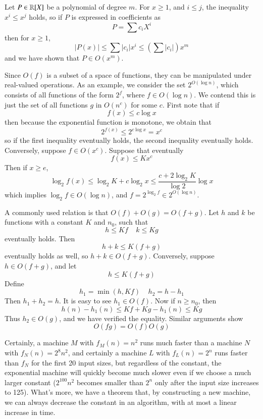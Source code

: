 \begin{example}
    Let $P \in \operatorname{\mathbb{R}}[X]$ be a polynomial of degree $m$. For $x \geq 1$, and $i \leq j$, the inequality $x^i \leq x^j$ holds, so if $P$ is expressed in coefficients as
    \[ P = \sum c_i X^i \]
    then for $x \geq 1$,
    \[ |P(x)| \leq \sum |c_i| x^i \leq \left( \sum |c_i| \right) x^m \]
    and we have shown that $P \in O(x^m)$.
\end{example}

\begin{example}
    Since $O(f)$ is a subset of a space of functions, they can be manipulated under real-valued operations. As an example, we consider the set $2^{O(\log n)}$, which consists of all functions of the form $2^f$, where $f \in O(\log n)$. We contend this is just the set of all functions $g$ in $O(n^c)$ for some $c$. First note that if
    \[ f(x) \leq c \log x \]
    then because the exponential function is monotone, we obtain that
    \[ 2^{f(x)} \leq 2^{c \log x} = x^c \]
    so if the first inequality eventually holds, the second inequality eventually holds. Conversely, suppose $f \in O(x^c)$. Suppose that eventually
    \[ f(x) \leq K x^c \]
    Then if $x \geq e$,
    \[ \log_2 f(x) \leq \log_2 K + c \log_2 x \leq \frac{c + 2 \log_2 K}{\log 2} \log x \]
    which implies $\log_2 f \in O(\log n)$, and $f = 2^{\log_2 f} \in 2^{O(\log n)}$.
\end{example}

\begin{example}
    A commonly used relation is that $O(f) + O(g) = O(f + g)$. Let $h$ and $k$ be functions with a constant $K$ and $n_0$, such that
    \[ h \leq Kf\ \ \ \ \ k \leq Kg \]
    eventually holds. Then
    \[ h + k \leq K(f + g)\]
    eventually holds as well, so $h + k \in O(f + g)$. Conversely, suppose $h \in O(f + g)$, and let
    \[ h \leq K(f + g) \]
    Define
    \[ h_1 = \min(h,Kf)\ \ \ \ \ h_2 = h - h_1 \]
    Then $h_1 + h_2 = h$. It is easy to see $h_1 \in O(f)$. Now if $n \geq n_0$, then
    \[ h(n) - h_1(n) \leq Kf + Kg - h_1(n) \leq Kg \]
    Thus $h_2 \in O(g)$, and we have verified the equality. Similar arguments show
    \[ O(fg) = O(f)O(g) \]
\end{example}

Certainly, a machine $M$ with $f_M(n) = n^2$ runs much faster than a machine $N$ with $f_N(n) = 2^8 n^2$, and certainly a machine $L$ with $f_L(n) = 2^n$ runs faster than $f_N$ for the first 20 input sizes, but regardless of the constant, the exponential machine will quickly become much slower even if we choose a much larger constant ($2^{100} n^2$ becomes smaller than $2^n$ only after the input size increases to 125). What's more, we have a theorem that, by constructing a new machine, we can always decrease the constant in an algorithm, with at most a linear increase in time.

